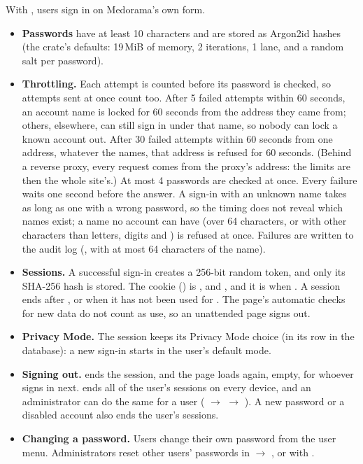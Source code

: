 With , users sign in on Medorama's own form.
\begin{itemize}
\item \textbf{Passwords} have at least 10 characters and are stored as Argon2id hashes (the
   crate's defaults: 19\,MiB of memory, 2 iterations, 1 lane, and a random salt
  per password).
\item \textbf{Throttling.} Each attempt is counted before its password is checked, so attempts
  sent at once count too. After 5 failed attempts within 60 seconds, an account name is locked
  for 60 seconds from the address they came from; others, elsewhere, can still sign in under
  that name, so nobody can lock a known account out. After 30 failed attempts within 60 seconds
  from one address, whatever the names, that address is refused for 60 seconds. (Behind a
  reverse proxy, every request comes from the proxy's address: the limits are then the whole
  site's.) At most 4 passwords are checked at once. Every failure waits one second before the
  answer. A sign-in with an unknown name takes as long as one with a wrong password, so the
  timing does not reveal which names exist; a name no account can have (over 64 characters, or
  with other characters than letters, digits and ) is refused at once. Failures
  are written to the audit log (, with at most 64 characters of the name).
\item \textbf{Sessions.} A successful sign-in creates a 256-bit random token, and only its
  SHA-256 hash is stored. The cookie () is ,
   and , and it is  when
  . A session ends after , or when it has not
  been used for . The page's automatic checks for new data do not
  count as use, so an unattended page signs out.
\item \textbf{Privacy Mode.} The session keeps its Privacy Mode choice (in its row in the
  database): a new sign-in starts in the user's default mode.
\item \textbf{Signing out.}  ends the session, and the page loads again, empty, for
  whoever signs in next.  ends all of
  the user's sessions on every device, and an administrator can do the same for a user
  ( $\rightarrow$  $\rightarrow$ ). A new password or a
  disabled account also ends the user's sessions.
\item \textbf{Changing a password.} Users change their own password from the user menu.
  Administrators reset other users' passwords in  $\rightarrow$ , or with
  .
\end{itemize}

